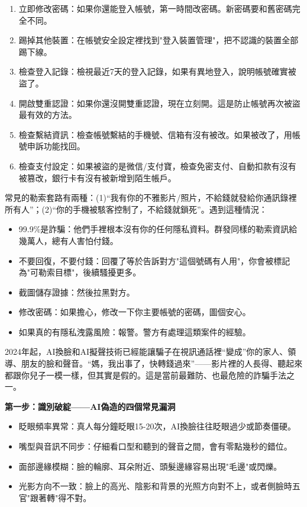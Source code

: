 \begin{enumerate}
  \item 立即修改密碼：如果你還能登入帳號，第一時間改密碼。新密碼要和舊密碼完全不同。
  \item 踢掉其他裝置：在帳號安全設定裡找到"登入裝置管理"，把不認識的裝置全部踢下線。
  \item 檢查登入記錄：檢視最近7天的登入記錄，如果有異地登入，說明帳號確實被盜了。
  \item 開啟雙重認證：如果你還沒開雙重認證，現在立刻開。這是防止帳號再次被盜最有效的方法。
  \item 檢查繫結資訊：檢查帳號繫結的手機號、信箱有沒有被改。如果被改了，用帳號申訴功能找回。
  \item 檢查支付設定：如果被盜的是微信/支付寶，檢查免密支付、自動扣款有沒有被篡改，銀行卡有沒有被新增到陌生帳戶。
\end{enumerate}


常見的勒索套路有兩種：(1)“我有你的不雅影片/照片，不給錢就發給你通訊錄裡所有人”；(2)“你的手機被駭客控制了，不給錢就鎖死”。遇到這種情況：

\begin{itemize}
  \item 99.9\%是詐騙：他們手裡根本沒有你的任何隱私資料。群發同樣的勒索資訊給幾萬人，總有人害怕付錢。
  \item 不要回復，不要付錢：回覆了等於告訴對方"這個號碼有人用"，你會被標記為"可勒索目標"，後續騷擾更多。
  \item 截圖儲存證據：然後拉黑對方。
  \item 修改密碼：如果擔心，修改一下你主要帳號的密碼，圖個安心。
  \item 如果真的有隱私洩露風險：報警。警方有處理這類案件的經驗。
\end{itemize}


2024年起，AI換臉和AI擬聲技術已經能讓騙子在視訊通話裡“變成”你的家人、領導、朋友的臉和聲音。“媽，我出事了，快轉錢過來”——影片裡的人長得、聽起來都跟你兒子一模一樣，但其實是假的。這是當前最難防、也最危險的詐騙手法之一。

\textbf{第一步：識別破綻——AI偽造的四個常見漏洞}\par

\begin{itemize}
  \item 眨眼頻率異常：真人每分鐘眨眼15-20次，AI換臉往往眨眼過少或節奏僵硬。
  \item 嘴型與音訊不同步：仔細看口型和聽到的聲音之間，會有零點幾秒的錯位。
  \item 面部邊緣模糊：臉的輪廓、耳朵附近、頭髮邊緣容易出現"毛邊"或閃爍。
  \item 光影方向不一致：臉上的高光、陰影和背景的光照方向對不上，或者側臉時五官"跟著轉"得不對。
\end{itemize}

